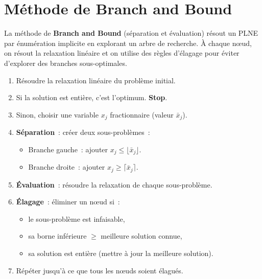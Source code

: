 \section{M\'ethode de Branch and Bound}

\begin{definition}
La m\'ethode de \textbf{Branch and Bound} (s\'eparation et \'evaluation)
r\'esout un PLNE par \'enum\'eration implicite en explorant un arbre de
recherche. \`A chaque n\oe ud, on r\'esout la relaxation lin\'eaire et on
utilise des r\`egles d'\'elagage pour \'eviter d'explorer des branches
sous-optimales.
\end{definition}

\begin{algorithme}[title=\textbf{Branch and Bound}]
\begin{enumerate}
  \item R\'esoudre la relaxation lin\'eaire du probl\`eme initial.
  \item Si la solution est enti\`ere, c'est l'optimum. \textbf{Stop}.
  \item Sinon, choisir une variable $x_j$ fractionnaire (valeur $\bar{x}_j$).
  \item \textbf{S\'eparation}~: cr\'eer deux sous-probl\`emes~:
    \begin{itemize}
      \item Branche gauche~: ajouter $x_j \leq \lfloor \bar{x}_j \rfloor$.
      \item Branche droite~: ajouter $x_j \geq \lceil \bar{x}_j \rceil$.
    \end{itemize}
  \item \textbf{\'Evaluation}~: r\'esoudre la relaxation de chaque
        sous-probl\`eme.
  \item \textbf{\'Elagage}~: \'eliminer un n\oe ud si~:
    \begin{itemize}
      \item le sous-probl\`eme est infaisable,
      \item sa borne inf\'erieure $\geq$ meilleure solution connue,
      \item sa solution est enti\`ere (mettre \`a jour la meilleure solution).
    \end{itemize}
  \item R\'ep\'eter jusqu'\`a ce que tous les n\oe uds soient \'elagu\'es.
\end{enumerate}
\end{algorithme}

